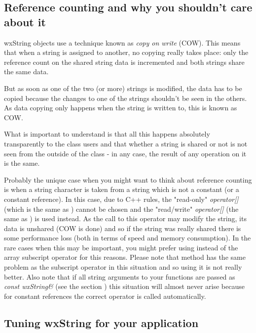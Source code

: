 \subsection{Reference counting and why you shouldn't care about it}\label{wxstringrefcount}

wxString objects use a technique known as {\it copy on write} (COW). This means
that when a string is assigned to another, no copying really takes place: only
the reference count on the shared string data is incremented and both strings
share the same data.

But as soon as one of the two (or more) strings is modified, the data has to be
copied because the changes to one of the strings shouldn't be seen in the
others. As data copying only happens when the string is written to, this is
known as COW.

What is important to understand is that all this happens absolutely
transparently to the class users and that whether a string is shared or not is
not seen from the outside of the class - in any case, the result of any
operation on it is the same.

Probably the unique case when you might want to think about reference
counting is when a string character is taken from a string which is not a
constant (or a constant reference). In this case, due to C++ rules, the
"read-only" {\it operator[]} (which is the same as 
) cannot be chosen and the "read/write" 
{\it operator[]} (the same as 
) is used instead. As the
call to this operator may modify the string, its data is unshared (COW is done)
and so if the string was really shared there is some performance loss (both in
terms of speed and memory consumption). In the rare cases when this may be
important, you might prefer using  instead
of the array subscript operator for this reasons. Please note that 
 method has the same problem as the subscript operator in
this situation and so using it is not really better. Also note that if all
string arguments to your functions are passed as {\it const wxString\&} (see the
section ) this situation will almost
never arise because for constant references the correct operator is called automatically.

\subsection{Tuning wxString for your application}\label{wxstringtuning}

